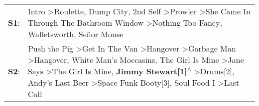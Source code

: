 \begin{supertabular}{p{0.03\textwidth}p{0.92\textwidth}}
 \textbf{S1}:  &                                                                                                                                                                                                                                                                                                                                           Intro\textsuperscript{} \textgreater \enspace Roulette\textsuperscript{}, \enspace Dump City\textsuperscript{}, \enspace 2nd Self\textsuperscript{} \textgreater \enspace Prowler\textsuperscript{} \textgreater \enspace She Came In Through The Bathroom Window\textsuperscript{} \textgreater \enspace Nothing Too Fancy\textsuperscript{}, \enspace Walletsworth\textsuperscript{}, \enspace Señor Mouse\textsuperscript{}  \enspace  \\
 \textbf{S2}:  &  Push the Pig\textsuperscript{} \textgreater \enspace Get In The Van\textsuperscript{} \textgreater \enspace Hangover\textsuperscript{} \textgreater \enspace Garbage Man\textsuperscript{} \textgreater \enspace Hangover\textsuperscript{}, \enspace White Man's Moccasins\textsuperscript{}, \enspace The Girl Is Mine\textsuperscript{} \textgreater \enspace Jane Says\textsuperscript{} \textgreater \enspace The Girl Is Mine\textsuperscript{}, \enspace \textbf{Jimmy Stewart[1]\textsuperscript{$\wedge$}} \textgreater \enspace Drums[2]\textsuperscript{}, \enspace Andy's Last Beer\textsuperscript{} \textgreater \enspace Space Funk Booty[3]\textsuperscript{}, \enspace Soul Food I\textsuperscript{} \textgreater \enspace Last Call\textsuperscript{}  \enspace  \\
\end{supertabular}
